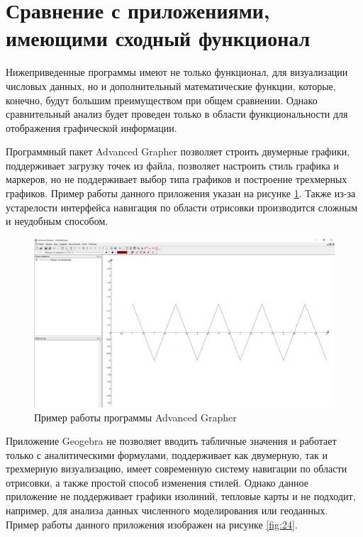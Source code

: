\section{Сравнение с приложениями, имеющими сходный функционал}
Нижеприведенные программы имеют не только функционал, для визуализации числовых данных, но и дополнительный математические функции, которые, конечно, будут большим преимуществом при общем сравнении. Однако сравнительный анализ будет проведен только в области функциональности для отображения графической информации.

Программный пакет Advanced Grapher позволяет строить двумерные графики, поддерживает загрузку точек из файла, позволяет настроить стиль графика и маркеров, но не поддерживает выбор типа графиков и построение трехмерных графиков. Пример работы данного приложения указан на рисунке \ref{fig:23}. Также из-за устарелости интерфейса навигация по области отрисовки производится сложным и неудобным способом.

\begin{figure}[h!]
    \center
    \includegraphics[scale=0.35]{fig/AdvancedGrapher.png}
    \caption{Пример работы программы Advanced Grapher}
    \label{fig:23}
\end{figure}

Приложение Geogebra не позволяет вводить табличные значения и работает только с аналитическими формулами, поддерживает как двумерную, так и трехмерную визуализацию, имеет современную систему навигации по области отрисовки, а также простой способ изменения стилей. Однако данное приложение не поддерживает графики изолиний, тепловые карты и не подходит, например, для анализа данных численного моделирования или геоданных. Пример работы данного приложения изображен на рисунке \ref{fig:24}.

